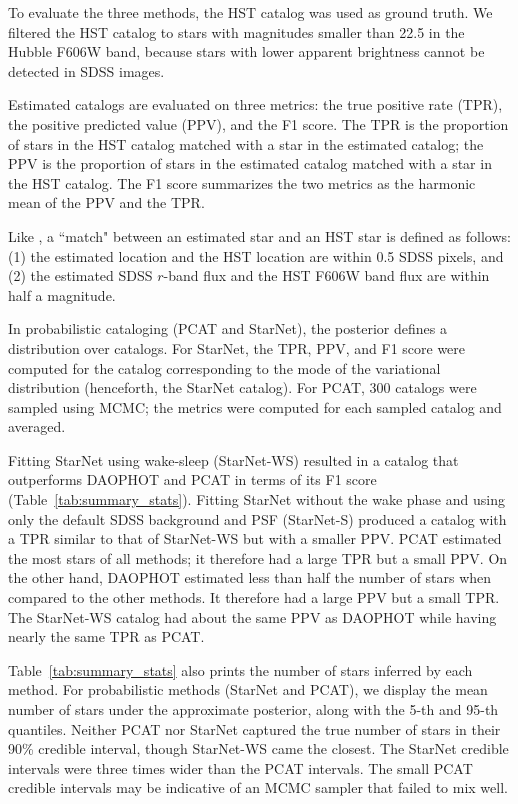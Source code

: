 To evaluate the three methods, the HST catalog was used as ground truth. 
We filtered the HST catalog to stars with magnitudes smaller than 22.5 in the Hubble F606W band, because stars with lower apparent brightness cannot be detected in SDSS images. 


Estimated catalogs are evaluated on three metrics: the true positive rate (TPR), the positive predicted value (PPV), and the F1 score. The TPR is the proportion of stars in the HST catalog matched with a star in the estimated catalog;
the PPV is the proportion of stars in the estimated catalog matched with a star in the HST catalog. The F1 score summarizes the two metrics as the harmonic mean of the PPV and the TPR.

Like \cite{Portillo_2017, Feder_2019}, a ``match" between an estimated star and an HST star is defined as follows: (1) the estimated location and the HST location are within 0.5 SDSS pixels, and (2) the estimated SDSS $r$-band flux and the HST F606W band flux are within half a magnitude. 

In probabilistic cataloging (PCAT and StarNet), the posterior defines a distribution over catalogs. 
For StarNet, the TPR, PPV, and F1 score were computed for the catalog corresponding to the mode of the variational distribution (henceforth, the StarNet catalog). 
For PCAT, 300 catalogs were sampled using MCMC; the metrics were computed for each sampled catalog and averaged. 


Fitting StarNet using wake-sleep (StarNet-WS) resulted in a catalog that outperforms DAOPHOT and PCAT in terms of its F1 score (Table~\ref{tab:summary_stats}). 
Fitting StarNet without the wake phase
and using only the default SDSS background and PSF (StarNet-S) produced a catalog with a TPR similar to that of StarNet-WS but with a smaller PPV.
PCAT estimated the most stars of all methods; it therefore had a large TPR but a small PPV. 
On the other hand, DAOPHOT estimated less than half the number of stars when compared to the other methods. It therefore had a large PPV but a small TPR. 
The StarNet-WS catalog had about the same PPV as DAOPHOT while having nearly the same TPR as PCAT. 

Table~\ref{tab:summary_stats} also prints the number of stars inferred by each method. 
For probabilistic methods (StarNet and PCAT), we display the mean number of stars under the approximate posterior, along with the 5-th and 95-th quantiles. 
Neither PCAT nor StarNet captured the true number of stars in their 90\% credible interval, though StarNet-WS came the closest. 
The StarNet credible intervals were three times wider than the PCAT intervals.
The small PCAT credible intervals may be indicative of an MCMC sampler that failed to mix well. 

